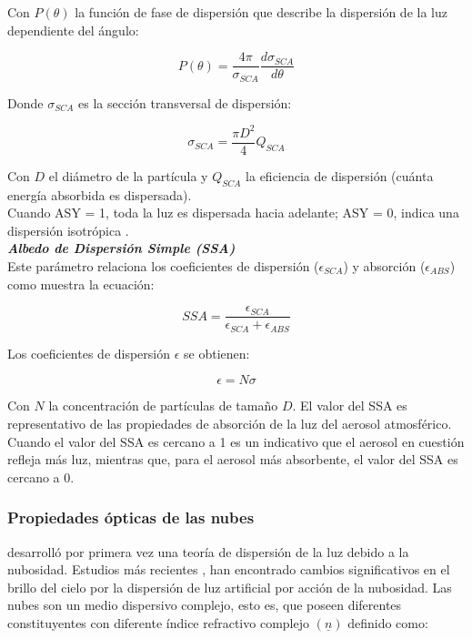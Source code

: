 Con $P(\theta)$ la función de fase de dispersión que describe la dispersión de la luz dependiente del ángulo:

\begin{equation}
P(\theta) = \frac{4\pi}{\sigma_{SCA}} \frac{d\sigma_{SCA}}{d\theta}
\end{equation}

Donde $\sigma_{SCA}$ es la sección transversal de dispersión:

\begin{equation}
\sigma_{SCA} = \frac{\pi D^{2}}{4} Q_{SCA}
\end{equation}

Con $D$ el diámetro de la partícula y $Q_{SCA}$ la eficiencia de dispersión (cuánta energía absorbida es dispersada).\\

Cuando ASY = 1, toda la luz es dispersada hacia adelante; ASY = 0, indica una dispersión isotrópica \citep{Solano2015}.
\\

\textit{\textbf{Albedo de Dispersión Simple (SSA)}}\\

Este parámetro relaciona los coeficientes de dispersión ($\epsilon_{SCA}$) y absorción ($\epsilon_{ABS}$) \citep{Foot1987} como muestra la ecuación:

\begin{equation}
SSA = \frac{\epsilon_{SCA}}{\epsilon_{SCA} + \epsilon_{ABS}}
\end{equation}


Los coeficientes de dispersión $\epsilon$ se obtienen:

\begin{equation}
\epsilon = N \sigma
\end{equation}

Con $N$ la concentración de partículas de tamaño $D$. El valor del SSA es representativo de las propiedades de absorción de la luz del aerosol atmosférico. Cuando el valor del SSA es cercano a 1 es un indicativo que el aerosol en cuestión refleja más luz, mientras que, para el aerosol más absorbente, el valor del SSA es cercano a 0.\\

\subsubsection{Propiedades ópticas de las nubes}

\cite{Twomey1967} desarrolló por primera vez una teoría de dispersión de la luz debido a la nubosidad. Estudios más recientes \citep{Kocifaj2007,Solano2014,Solano2015}, han encontrado cambios significativos en el brillo del cielo por la dispersión de luz artificial por acción de la nubosidad. Las nubes son un medio dispersivo complejo, esto es, que poseen diferentes constituyentes con diferente índice refractivo complejo $(\underline{n})$ definido como:

